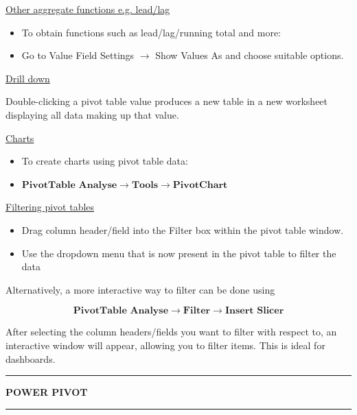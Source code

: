 \documentclass[8pt]{extarticle}
\newcommand{\heading}[1]{%
    \noindent
    \rule{\linewidth}{0.4pt}
    \begin{center}
        \vspace{-1ex}
        \textbf{#1}        
        \vspace{-2.5ex}
    \end{center}
    \rule{\linewidth}{0.4pt}
}
\begin{document}
\begin{multicols}{3}
\begin{center}
    \underline{Other aggregate functions e.g. lead/lag}
\end{center}

\begin{itemize}
    \item To obtain functions such as lead/lag/running total and more:
    \item Go to Value Field Settings $\rightarrow$ Show Values As and choose suitable options.
\end{itemize}

\begin{center}
    \underline{Drill down}
\end{center}

Double-clicking a pivot table value produces a new table in a new worksheet displaying all data making up that value.

\columnbreak
\begin{center}
    \underline{Charts}
\end{center}

\begin{itemize}
    \item To create charts using pivot table data:
    \item $\textbf{PivotTable Analyse} \rightarrow \textbf{Tools} \rightarrow \textbf{PivotChart}$
\end{itemize}

\begin{center}
    \underline{Filtering pivot tables}
\end{center}

\begin{itemize}
    \item Drag column header/field into the Filter box within the pivot table window. 
    \item Use the dropdown menu that is now present in the pivot table to filter the data
\end{itemize}

Alternatively, a more interactive way to filter can be done using 

\[\textbf{PivotTable Analyse} \rightarrow \textbf{Filter} \rightarrow \textbf{Insert Slicer}\]

After selecting the column headers/fields you want to filter with respect to, an interactive window will appear, allowing you to filter items. This is ideal for dashboards.

\heading{POWER PIVOT}


\end{multicols}
\end{document}
